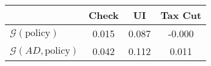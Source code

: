 \begin{tabular}{@{}lccc@{}} 
\toprule 
                          & Check      & UI    & Tax Cut    \\  \midrule 
$\mathcal{G}(\text{policy})$ & 0.015  & 0.087  & -0.000     \\ 
$\mathcal{G}(AD,\text{policy})$ & 0.042  & 0.112  & 0.011     \\ 
\end{tabular}  
